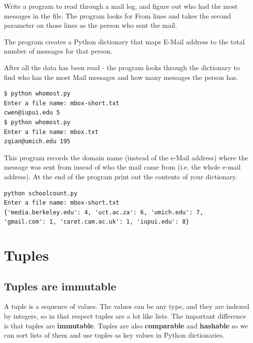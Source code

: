 \documentclass[10pt]{book}
\begin{document}
\begin{ex}
Write a program to read through a mail log, and figure 
out who had the most messages in the file.  The program looks 
for From lines and takes the second parameter on those 
lines as the person who sent the mail.

The program creates a Python dictionary that maps 
E-Mail address to the total number of messages for that person.

After all the data has been read - the program looks 
through the dictionary to find who has the most Mail 
messages and how many messages the person has.

\beforeverb
\begin{verbatim}
$ python whomost.py 
Enter a file name: mbox-short.txt
cwen@iupui.edu 5
$ python whomost.py 
Enter a file name: mbox.txt
zqian@umich.edu 195
\end{verbatim}
\afterverb
\end{ex}

\begin{ex}
This program records the domain name (instead of the e-Mail address) 
where the message was sent from insead of who the mail 
came from (i.e. the whole e-mail address). At the end 
of the program print out the contents of your dictionary. 

\beforeverb
\begin{verbatim}
python schoolcount.py
Enter a file name: mbox-short.txt
{'media.berkeley.edu': 4, 'uct.ac.za': 6, 'umich.edu': 7, 
'gmail.com': 1, 'caret.cam.ac.uk': 1, 'iupui.edu': 8}
\end{verbatim}
\afterverb
\end{ex}

\chapter{Tuples}
\label{tuplechap}

\section{Tuples are immutable}


A tuple is a sequence of values.  The values can be any type, and
they are indexed by integers, so in that respect tuples are a lot
like lists.  The important difference is that tuples are {\bf immutable}.
Tuples are also {\bf comparable} and {\bf hashable} so we can 
sort lists of them and use tuples as key values in Python
dictionaries.
\end{document}
